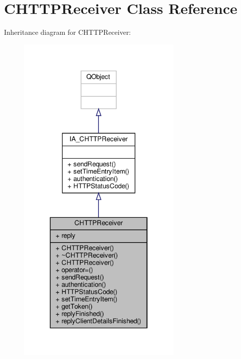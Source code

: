 \hypertarget{classCHTTPReceiver}{}\section{C\+H\+T\+T\+P\+Receiver Class Reference}
\label{classCHTTPReceiver}


Inheritance diagram for C\+H\+T\+T\+P\+Receiver\+:
\nopagebreak
\begin{figure}[H]
\begin{center}
\leavevmode
\includegraphics[width=226pt]{classCHTTPReceiver__inherit__graph}
\end{center}
\end{figure}


